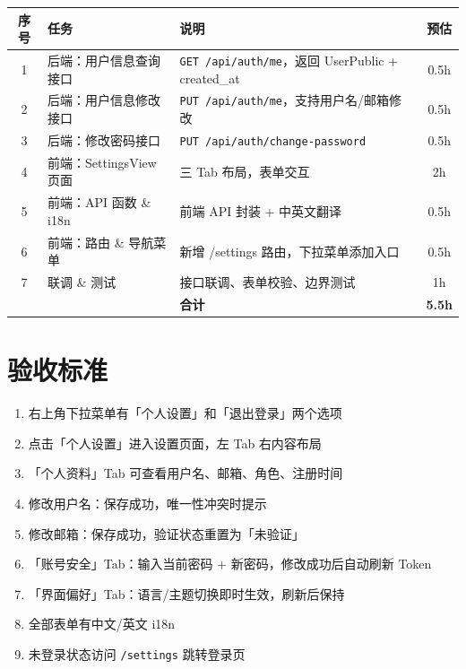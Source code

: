 \documentclass[11pt,a4paper]{article}
\begin{document}
\begin{table}[h]
\centering
\small
\begin{tabular}{clp{5cm}c}
\toprule
\textbf{序号} & \textbf{任务} & \textbf{说明} & \textbf{预估} \\
\midrule
1 & 后端：用户信息查询接口 & \texttt{GET /api/auth/me}，返回 UserPublic + created\_at & 0.5h \\
2 & 后端：用户信息修改接口 & \texttt{PUT /api/auth/me}，支持用户名/邮箱修改 & 0.5h \\
3 & 后端：修改密码接口 & \texttt{PUT /api/auth/change-password} & 0.5h \\
4 & 前端：SettingsView 页面 & 三 Tab 布局，表单交互 & 2h \\
5 & 前端：API 函数 \& i18n & 前端 API 封装 + 中英文翻译 & 0.5h \\
6 & 前端：路由 \& 导航菜单 & 新增 /settings 路由，下拉菜单添加入口 & 0.5h \\
7 & 联调 \& 测试 & 接口联调、表单校验、边界测试 & 1h \\
\midrule
 & & \textbf{合计} & \textbf{5.5h} \\
\bottomrule
\end{tabular}
\end{table}

\section{验收标准}

\begin{enumerate}[nosep]
  \item[\textcolor{success}{\checkmark}] 右上角下拉菜单有「个人设置」和「退出登录」两个选项
  \item[\textcolor{graytext}{$\square$}] 点击「个人设置」进入设置页面，左 Tab 右内容布局
  \item[\textcolor{graytext}{$\square$}] 「个人资料」Tab 可查看用户名、邮箱、角色、注册时间
  \item[\textcolor{graytext}{$\square$}] 修改用户名：保存成功，唯一性冲突时提示
  \item[\textcolor{graytext}{$\square$}] 修改邮箱：保存成功，验证状态重置为「未验证」
  \item[\textcolor{graytext}{$\square$}] 「账号安全」Tab：输入当前密码 + 新密码，修改成功后自动刷新 Token
  \item[\textcolor{graytext}{$\square$}] 「界面偏好」Tab：语言/主题切换即时生效，刷新后保持
  \item[\textcolor{graytext}{$\square$}] 全部表单有中文/英文 i18n
  \item[\textcolor{graytext}{$\square$}] 未登录状态访问 \texttt{/settings} 跳转登录页
\end{enumerate}
\end{document}
